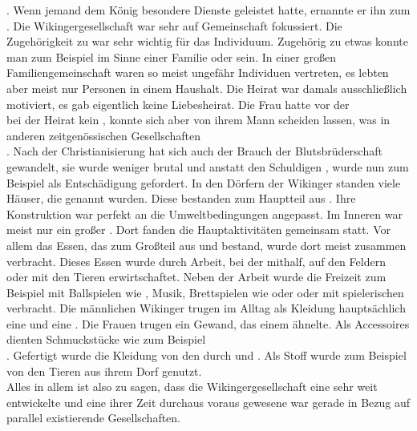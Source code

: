 \documentclass[12pt,a4paper,ngerman,openany]{book}
\newlength{\diebox}
\newcommand{\luecke}[1]{\settowidth{\diebox}{#1}\raisebox{-1.0ex}{\parbox{2.7\diebox}{\dotfill}}}
\begin{document}
\luecke{lauf..}. Wenn jemand dem König besondere Dienste geleistet hatte, ernannte er ihn zum \luecke{Jarl}.
Die Wikingergesellschaft war sehr auf Gemeinschaft fokussiert. Die Zugehörigkeit zu \luecke{einer Sippe} war sehr wichtig für das Individuum. Zugehörig zu etwas konnte man zum Beispiel im Sinne einer Familie oder \luecke{einer Blutsbrüderschaft} sein.
In einer großen Familiengemeinschaft waren so meist ungefähr \luecke{50} Individuen vertreten, es lebten aber meist nur \luecke{10 bis 13} Personen in einem Haushalt.
Die Heirat war damals ausschließlich \luecke{strategisch} motiviert, es gab eigentlich keine Liebesheirat. Die Frau hatte vor der \luecke{Chris.}\\
\luecke{tian.} bei der Heirat kein \luecke{Mitspra.}, konnte sich aber von ihrem Mann scheiden lassen, was in anderen zeitgenössischen Gesellschaften \luecke{ni.}\\
\luecke{ht mögli}.
Nach der Christianisierung hat sich auch der Brauch der Blutsbrüderschaft gewandelt, sie wurde weniger brutal und anstatt den Schuldigen \luecke{umzubringen}, wurde nun zum Beispiel \luecke{Geld} als Entschädigung gefordert.
In den Dörfern der Wikinger standen viele Häuser, die \luecke{Langhäuser} genannt wurden. Diese bestanden zum Hauptteil aus \luecke{Holz}. Ihre Konstruktion war perfekt an die Umweltbedingungen angepasst. Im Inneren war meist nur ein großer \luecke{Hauptr.}. Dort fanden die Hauptaktivitäten gemeinsam statt. Vor allem das Essen, das zum Großteil aus \luecke{fleischhaltigen Lebens..} und \luecke{Getreide} bestand, wurde dort meist zusammen verbracht. Dieses Essen wurde durch Arbeit, bei der \luecke{jeder} mithalf, auf den Feldern oder mit den Tieren erwirtschaftet. Neben der Arbeit wurde die Freizeit zum Beispiel mit Ballspielen wie \luecke{knattl.}, Musik, Brettspielen wie \luecke{Müh.} oder \luecke{Schac.} oder mit spielerischen \luecke{Kämpfen} verbracht. 
Die männlichen Wikinger trugen im Alltag als Kleidung hauptsächlich eine \luecke{Tu..} und eine \luecke{Hose}. Die Frauen trugen ein Gewand, das einem \luecke{Kleid} ähnelte. Als Accessoires dienten Schmuckstücke wie zum Beispiel \luecke{Bro.}\\
\luecke{sch}. Gefertigt wurde die Kleidung von den \luecke{Fraue.........} durch \luecke{Spinnen} und \luecke{Weben}. Als Stoff wurde zum Beispiel \luecke{Wolle} von den Tieren aus ihrem Dorf genutzt.
\\
Alles in allem ist also zu sagen, dass die Wikingergesellschaft eine sehr weit entwickelte und eine ihrer Zeit durchaus voraus gewesene war gerade in Bezug auf parallel existierende Gesellschaften. 
\end{document}
